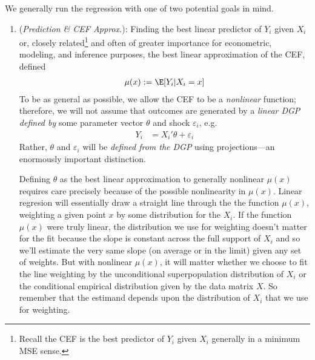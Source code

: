 \documentclass[12pt]{article}
\theoremstyle{plain}
\theoremstyle{definition}
\theoremstyle{remark}
\begin{document}
We generally run the regression with one of two potential goals in mind.
\begin{enumerate}
  \item
    (\emph{Prediction \& CEF Approx.}):
    Finding the best linear predictor of $Y_i$ given $X_i$ or, closely
    related\footnote{%
      Recall the CEF is the best predictor of $Y_i$ given $X_i$
      generally in a minimum MSE sense.
    }
    and often of greater importance for econometric, modeling, and
    inference purposes, the best linear approximation of the CEF,
    defined
    \begin{align*}
      \mu(x):=\E[Y_i|X_i=x]
    \end{align*}
    To be as general as possible, we allow the CEF to be a
    \emph{nonlinear} function;
    therefore, we will not assume that outcomes are generated by a
    \emph{linear DGP defined by} some parameter vector $\theta$
    and shock $\varepsilon_i$, e.g.
    \begin{align}
      Y_i
      &=
      X_i'\theta
      +
      \varepsilon_i
      \label{regeq}
    \end{align}
    Rather, $\theta$ and $\varepsilon_i$ will be
    \emph{defined from the DGP} using projections---an enormously
    important distinction.

    Defining $\theta$ as the best linear approximation to generally
    nonlinear $\mu(x)$ requires care precisely because of the possible
    nonlinearity in $\mu(x)$.
    Linear regresion will essentially draw a straight line through the
    the function $\mu(x)$, weighting a given point $x$ by some
    distribution for the $X_i$.
    If the function $\mu(x)$ were truly linear, the distribution we use
    for weighting doesn't matter for the fit because the slope is
    constant across the full support of $X_i$ and so we'll estimate the
    very same slope (on average or in the limit) given any set of
    weights.
    But with nonlinear $\mu(x)$, it will matter whether we choose to fit
    the line weighting by the unconditional superpopulation distribution
    of $X_i$ or the conditional empirical distribution given by the
    data matrix $X$.
    So remember that the estimand depends upon the distribution of $X_i$
    that we use for weighting.


\end{enumerate}
\end{document}
